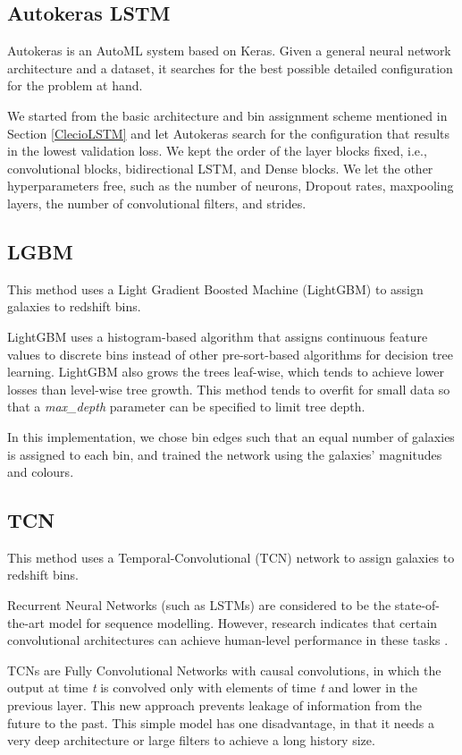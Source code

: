 \documentclass[twocolumn,twocolappendix]{aastex63}
\begin{document}
\subsection{ {\sc Autokeras LSTM}}
Autokeras \citep{autokeras} is an AutoML system based on Keras. Given a general neural network
architecture and a dataset, it searches for the best possible detailed configuration for the problem
at hand. 
 
We started from the basic architecture and bin assignment scheme mentioned in Section
\ref{ClecioLSTM} and let Autokeras search for the configuration that results in the lowest
validation loss. We kept the order of the layer blocks fixed, i.e., convolutional blocks,
bidirectional LSTM, and Dense blocks. We let the other hyperparameters free, such as the number of
neurons,  Dropout rates, maxpooling layers, the number of convolutional filters, and strides.


\subsection{ {\sc LGBM} }
This method uses a Light Gradient Boosted Machine (LightGBM) \citep{lgbm} to assign galaxies to
redshift bins.
 
LightGBM uses a histogram-based algorithm that assigns continuous feature values to discrete bins
instead of other pre-sort-based algorithms for decision tree learning. LightGBM also grows the trees
leaf-wise, which tends to achieve lower losses than level-wise tree growth. This method tends to
overfit for small data so that a \textit{max\_depth} parameter can be specified to limit tree depth.

 
In this implementation, we chose bin edges such that an equal number of galaxies is assigned to each
bin, and trained the network using the galaxies' magnitudes and colours.

 
\subsection{ {\sc TCN}}
This method uses a Temporal-Convolutional (TCN) \citep{baitcn} network to assign galaxies to redshift
bins.
 
Recurrent Neural Networks (such as LSTMs) are considered to be the state-of-the-art model for
sequence modelling. However, research indicates that certain convolutional architectures can achieve
human-level performance in these tasks \citep{dauphin}.
 
TCNs are Fully Convolutional Networks with causal convolutions, in which the output at time
\textit{t} is convolved only with elements of time \textit{t} and lower in the previous layer. This
new approach prevents leakage of information from the future to the past. This simple model has one
disadvantage, in that it needs a very deep architecture or large filters to achieve a long history
size. 
 
\end{document}
